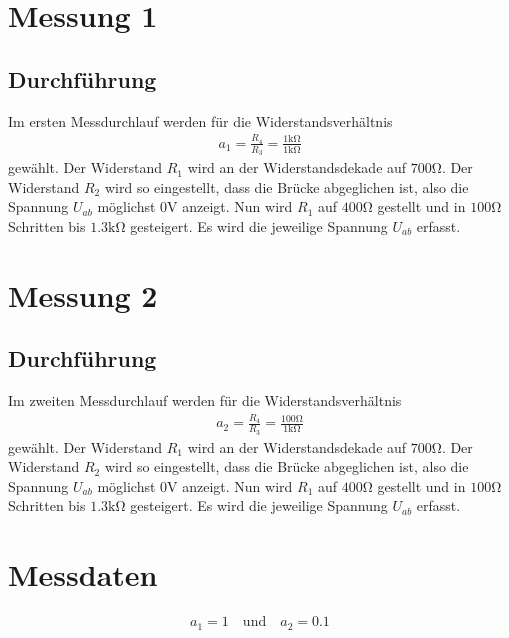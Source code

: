 \section[Messung 1]{Messung 1}
\subsection{Durchführung}

Im ersten Messdurchlauf werden für die Widerstandsverhältnis
\begin{align}
    a_1 = \frac{R_4}{R_3} = \frac{1 \si{\kilo\ohm}}{1 \si{\kilo\ohm}}
\end{align}
gewählt.
Der Widerstand \( R_1 \) wird an der Widerstandsdekade auf \( 700 \si{\ohm} \).
Der Widerstand \( R_2 \) wird so eingestellt, dass die Brücke abgeglichen ist,
also die Spannung \( U_{ab} \) möglichst \( 0 \si{\volt} \) anzeigt.
Nun wird \( R_1 \) auf \( 400 \si{\ohm} \) gestellt und in \( 100 \si{\ohm} \) Schritten bis \( 1.3 \si{\kilo\ohm} \) gesteigert.
Es wird die jeweilige Spannung \( U_{ab} \) erfasst.

\section[Messung 2]{Messung 2}
\subsection{Durchführung}

Im zweiten Messdurchlauf werden für die Widerstandsverhältnis
\begin{align}
    a_2 = \frac{R_4}{R_3} = \frac{100 \si{\ohm}}{1 \si{\kilo\ohm}}
\end{align}
gewählt.
Der Widerstand \( R_1 \) wird an der Widerstandsdekade auf \( 700 \si{\ohm} \).
Der Widerstand \( R_2 \) wird so eingestellt, dass die Brücke abgeglichen ist,
also die Spannung \( U_{ab} \) möglichst \( 0 \si{\volt} \) anzeigt.
Nun wird \( R_1 \) auf \( 400 \si{\ohm} \) gestellt und in \( 100 \si{\ohm} \) Schritten bis \( 1.3 \si{\kilo\ohm} \) gesteigert.
Es wird die jeweilige Spannung \( U_{ab} \) erfasst.

\section[Messdaten]{Messdaten}

\begin{align*}
    a_1 = 1 \quad \text{und} \quad a_2 = 0.1
\end{align*}

